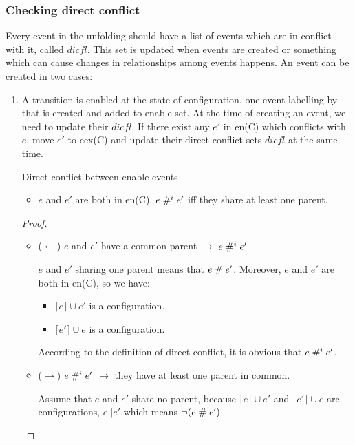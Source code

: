\documentclass{llncs}
\begin{document}
\subsubsection{Checking direct conflict}
Every event in the unfolding should have a list of events which are in conflict with it, called $dicfl$. This set is updated when events are created or something which can cause changes in relationships among events happens.
An event can be created in two cases:
\begin{enumerate}
	\item
	A transition is enabled at the state of configuration, one event labelling by that is
	created and added to enable set. At the time of creating an event, we need to update their $dicfl$. If there exist any $e'$ in en(C) which conflicts with $e$,
	move $e'$ to cex(C) and update their direct conflict sets $dicfl$ at the same time. 		
	
	\begin{lemma}{Direct conflict between enable events}
		\begin{itemize}
			\item
			$e$ and $e'$ are both in en(C), $e \mathrel{\#^i_{}} e'$ iff they share at least one parent.		
		\end{itemize}
		\label{thm:lem1}
	\end{lemma}
	
	\begin{proof}
		\begin{itemize}
		\item
			($\leftarrow$) $e$ and $e'$ have a common parent $\rightarrow$ $e \mathrel{\#^i_{}} e'$
			
			$e$ and $e'$ sharing one parent means that  $e \mathrel{\#} e'$. Moreover, $e$ and $e'$ are both in
			en(C), so we have:
			\begin{itemize}
			\item
				$\lceil e \rceil \cup e'$ is a configuration.
			\item
				$\lceil e' \rceil \cup e$ is a configuration.
			\end{itemize} 
			According to the definition of direct conflict, it is obvious that $e \mathrel{\#^i_{}} e'$.
			
		\item
			($\rightarrow$) $e \mathrel{\#^i_{}} e'$ $\rightarrow$ they have at least one parent in common.
			
			Assume that $e$ and $e'$ share no parent, because $\lceil e \rceil \cup e'$ and $\lceil
			e' \rceil \cup e$ are configurations, $e || e'$ which means $\lnot (e \mathrel{\#} e')$
		\end{itemize}			
	\end{proof}			
	

\end{enumerate}
\end{document}
